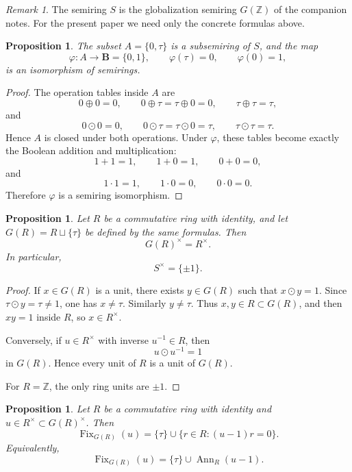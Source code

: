 \documentclass[11pt,a4paper]{article}
\newtheorem{proposition}[theorem]{Proposition}
\theoremstyle{definition}
\theoremstyle{remark}
\newtheorem{remark}[theorem]{Remark}
\DeclareMathOperator{\Fix}{Fix}
\DeclareMathOperator{\Ann}{Ann}
\newcommand{\ZZ}{\mathbb Z}
\newcommand{\BB}{\mathbf B}
\begin{document}
\begin{remark}
The semiring \(S\) is the globalization semiring \(G(\ZZ)\) of the companion notes. For the present paper we need only the concrete formulas above.
\end{remark}

\begin{proposition}
The subset \(A=\{0,\tau\}\) is a subsemiring of \(S\), and the map
\[
\varphi:A\longrightarrow \BB=\{0,1\},
\qquad
\varphi(\tau)=0,
\qquad
\varphi(0)=1,
\]
is an isomorphism of semirings.
\end{proposition}

\begin{proof}
The operation tables inside \(A\) are
\[
0\oplus0=0,
\qquad
0\oplus\tau=\tau\oplus0=0,
\qquad
\tau\oplus\tau=\tau,
\]
and
\[
0\odot0=0,
\qquad
0\odot\tau=\tau\odot0=\tau,
\qquad
\tau\odot\tau=\tau.
\]
Hence \(A\) is closed under both operations. Under \(\varphi\), these tables become exactly the Boolean addition and multiplication:
\[
1+1=1,
\qquad
1+0=1,
\qquad
0+0=0,
\]
and
\[
1\cdot1=1,
\qquad
1\cdot0=0,
\qquad
0\cdot0=0.
\]
Therefore \(\varphi\) is a semiring isomorphism.
\end{proof}

\begin{proposition}
Let \(R\) be a commutative ring with identity, and let \(G(R)=R\sqcup\{\tau\}\) be defined by the same formulas. Then
\[
G(R)^\times=R^\times.
\]
In particular,
\[
S^\times=\{\pm1\}.
\]
\end{proposition}

\begin{proof}
If \(x\in G(R)\) is a unit, there exists \(y\in G(R)\) such that \(x\odot y=1\). Since \(\tau\odot y=\tau\ne1\), one has \(x\ne\tau\). Similarly \(y\ne\tau\). Thus \(x,y\in R\subset G(R)\), and then \(xy=1\) inside \(R\), so \(x\in R^\times\).

Conversely, if \(u\in R^\times\) with inverse \(u^{-1}\in R\), then
\[
u\odot u^{-1}=1
\]
in \(G(R)\). Hence every unit of \(R\) is a unit of \(G(R)\).

For \(R=\ZZ\), the only ring units are \(\pm1\).
\end{proof}

\begin{proposition}
Let \(R\) be a commutative ring with identity and \(u\in R^\times\subset G(R)^\times\). Then
\[
\Fix_{G(R)}(u)=\{\tau\}\cup\{r\in R:(u-1)r=0\}.
\]
Equivalently,
\[
\Fix_{G(R)}(u)=\{\tau\}\cup\Ann_R(u-1).
\]
\end{proposition}
\end{document}
